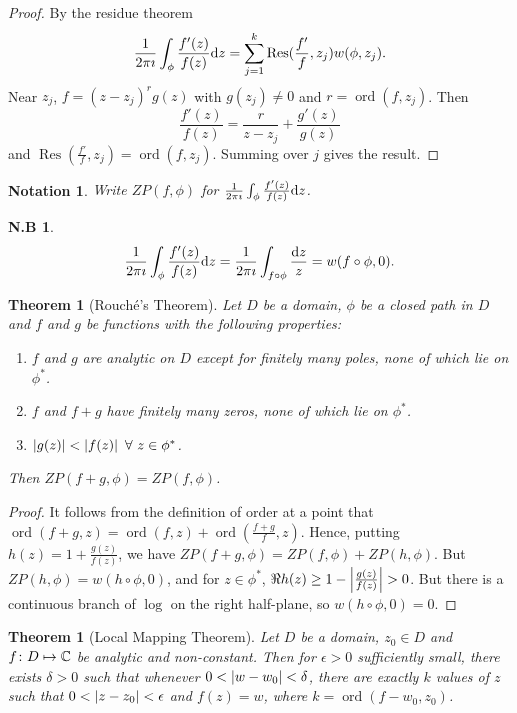 \documentclass{notes}
\theoremstyle{plain}
\newtheorem{theorem}[proposition]{Theorem}
\newtheorem*{notes}{N.B}
\newtheorem*{notation}{Notation}
\DeclareMathOperator{\Res}{Res}
\DeclareMathOperator{\ord}{ord}
\begin{document}
\begin{proof}
By the residue theorem
\[
\frac{1}{2 \pi \imath} \int_\phi \frac{f'(z)}{f(z)} \ud z = 
\sum_{j=1}^k \Res (\frac{f'}{f},z_j) w(\phi,z_j).
\]
Near $z_j$, $f = (z-z_j)^r g(z)$ with $g(z_j) \neq 0$ and $r = \ord(f,z_j)$.
Then
\[
\frac{f'(z)}{f(z)} = \frac{r}{z-z_j} + \frac{g'(z)}{g(z)}
\]
and $\Res (\frac{f'}{f},z_j) = \ord(f, z_j)$.  Summing over $j$ gives the
result.
\end{proof}

\begin{notation}
Write $ZP(f,\phi)$ for $\frac{1}{2 \pi \imath} \int_\phi \frac{f'(z)}{f(z)}
\mathrm{d} z$.
\end{notation}

\begin{notes}
\[
\frac{1}{2 \pi \imath} \int_\phi \frac{f'(z)}{f(z)} \mathrm{d} z =
\frac{1}{2 \pi \imath} \int_{f \circ \phi} \frac{\mathrm{d} z}{z} = w(f \circ \phi,0).
\]
\end{notes}

\begin{theorem}[Rouch\'{e}'s Theorem]%
Let $D$ be a domain, $\phi$ be a closed path in $D$ and $f$ and $g$ be
functions with the following properties:
\begin{enumerate}
\item $f$ and $g$ are analytic on $D$ except for finitely many poles, none
of which lie on $\phi^*$.
\item $f$ and $f+g$ have finitely many zeros, none of which lie on $\phi^*$.
\item $\abs{g(z)} < \abs{f(z)}\ \forall\ z \in \phi^*$.
\end{enumerate}
Then $ZP(f+g,\phi) = ZP(f,\phi)$.
\end{theorem}

\begin{proof}
It follows from the definition of order at a point that
$\ord(f+g,z) = \ord(f,z) + \ord(\frac{f+g}{f},z)$.  Hence, putting
$h(z) = 1 + \frac{g(z)}{f(z)}$, we have $ZP(f+g,\phi) = ZP(f,\phi) + 
ZP(h, \phi)$.  But $ZP(h,\phi) = w(h \circ \phi,0)$, and for
$z \in \phi^*$, $\Re h(z) \ge 1 - \left|\frac{g(z)}{f(z)}\right| > 0$.  But there
is a continuous branch of $\log$ on the right half-plane, so $w(h \circ \phi,0)
= 0$.
\end{proof}

\begin{theorem}[Local Mapping Theorem]%
Let $D$ be a domain, $z_0 \in D$ and $f \colon D \mapsto \mathbb{C}$ be analytic and 
non-constant.  Then for $\epsilon > 0$ sufficiently small, there exists
$\delta > 0$ such that whenever $0 < \left|w - w_0\right| < \delta$, there are
exactly $k$ values of $z$ such that $0 < \left|z - z_0\right| < \epsilon$ and
$f(z)=w$, where $k = \ord(f-w_0,z_0)$.
\end{theorem}
\end{document}
